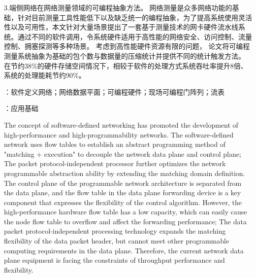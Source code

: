 3.端侧网络在网络测量领域的可编程抽象方法。
网络测量是众多网络功能的基础，针对目前测量工具性能低下以及缺乏统一的编程抽象，为了提高系统使用灵活性以及可用性，本文针对大量场景提出了一套基于测量技术的网卡硬件流水线系统。通过不同的软件调用，令系统硬件适用于高性能的网络安全、访问控制、流量控制、拥塞探测等多种场景。
考虑到高性能硬件资源有限的问题，
论文将可编程测量系统抽象为基础的包个数与数据量的压缩统计并提供不同的统计触发方法。
在节约38\%的硬件存储空间情况下，相较于软件的处理方式系统吞吐率提升8倍、系统的处理能耗节约90\%。



{\boldsong}
\vspace{\baselineskip}
：软件定义网络；网络数据平面；可编程硬件；现场可编程门阵列；流表

\vspace{\baselineskip}
：应用基础


\clearpage


%
\noindent The concept of software-defined networking has promoted the development of high-performance and high-programmability networks.
The software-defined network uses flow tables to establish an abstract programming method of "matching + execution" to decouple the network data plane and control plane;
The packet protocol-independent processor further optimizes the network programmable abstraction ability by extending the matching domain definition.
The control plane of the programmable network architecture is separated from the data plane, and the flow table in the data plane forwarding device is a key component that expresses the flexibility of the control algorithm. However, the high-performance hardware flow table has a low capacity, which can easily cause the node flow table to overflow and affect the forwarding performance;
The data packet protocol-independent processing technology expands the matching flexibility of the data packet header, but cannot meet other programmable computing requirements in the data plane. Therefore, the current network data plane equipment is facing the constraints of throughput performance and flexibility.\newline


